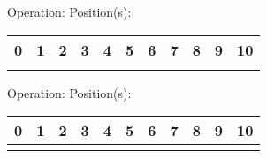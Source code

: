 Operation: \underline{\hspace{3cm}} \hspace{10px} Position(s): \underline{\hspace{2cm}}
\begin{center}
    \begin{tabular}{|P{0.75cm}|P{0.75cm}|P{0.75cm}|P{0.75cm}|P{0.75cm}|P{0.75cm}|P{0.75cm}|P{0.75cm}|P{0.75cm}|P{0.75cm}|P{0.75cm}|}
         & 1 & 2 & 3 & 4 & 5 & 6 & 7 & 8 & 9 & 10  \\
        \hline
        &&&&&&&&&& \\
        \hline
    \end{tabular}
\end{center}
Operation: \underline{\hspace{3cm}} \hspace{10px} Position(s): \underline{\hspace{2cm}}
\begin{center}
    \begin{tabular}{|P{0.75cm}|P{0.75cm}|P{0.75cm}|P{0.75cm}|P{0.75cm}|P{0.75cm}|P{0.75cm}|P{0.75cm}|P{0.75cm}|P{0.75cm}|P{0.75cm}|}
         & 1 & 2 & 3 & 4 & 5 & 6 & 7 & 8 & 9 & 10  \\
        \hline
        &&&&&&&&&& \\
        \hline
    \end{tabular}
\end{center}
